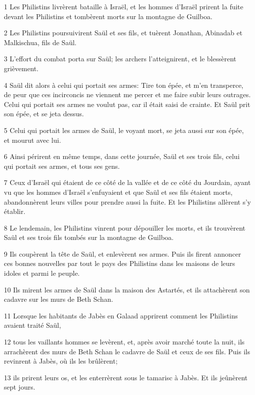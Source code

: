 \par 1 Les Philistins livrèrent bataille à Israël, et les hommes d'Israël prirent la fuite devant les Philistins et tombèrent morts sur la montagne de Guilboa.
\par 2 Les Philistins poursuivirent Saül et ses fils, et tuèrent Jonathan, Abinadab et Malkischua, fils de Saül.
\par 3 L'effort du combat porta sur Saül; les archers l'atteignirent, et le blessèrent grièvement.
\par 4 Saül dit alors à celui qui portait ses armes: Tire ton épée, et m'en transperce, de peur que ces incirconcis ne viennent me percer et me faire subir leurs outrages. Celui qui portait ses armes ne voulut pas, car il était saisi de crainte. Et Saül prit son épée, et se jeta dessus.
\par 5 Celui qui portait les armes de Saül, le voyant mort, se jeta aussi sur son épée, et mourut avec lui.
\par 6 Ainsi périrent en même temps, dans cette journée, Saül et ses trois fils, celui qui portait ses armes, et tous ses gens.
\par 7 Ceux d'Israël qui étaient de ce côté de la vallée et de ce côté du Jourdain, ayant vu que les hommes d'Israël s'enfuyaient et que Saül et ses fils étaient morts, abandonnèrent leurs villes pour prendre aussi la fuite. Et les Philistins allèrent s'y établir.
\par 8 Le lendemain, les Philistins vinrent pour dépouiller les morts, et ils trouvèrent Saül et ses trois fils tombés sur la montagne de Guilboa.
\par 9 Ils coupèrent la tête de Saül, et enlevèrent ses armes. Puis ils firent annoncer ces bonnes nouvelles par tout le pays des Philistins dans les maisons de leurs idoles et parmi le peuple.
\par 10 Ils mirent les armes de Saül dans la maison des Astartés, et ils attachèrent son cadavre sur les murs de Beth Schan.
\par 11 Lorsque les habitants de Jabès en Galaad apprirent comment les Philistins avaient traité Saül,
\par 12 tous les vaillants hommes se levèrent, et, après avoir marché toute la nuit, ils arrachèrent des murs de Beth Schan le cadavre de Saül et ceux de ses fils. Puis ils revinrent à Jabès, où ils les brûlèrent;
\par 13 ils prirent leurs os, et les enterrèrent sous le tamarisc à Jabès. Et ils jeûnèrent sept jours.


